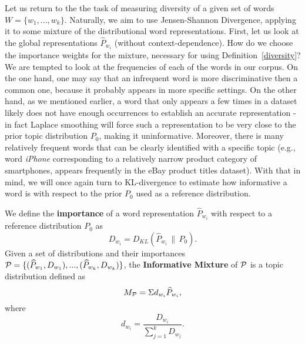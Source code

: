 Let us return to the the task of measuring diversity of a given set of words
$W=\{w_1,...,w_k\}$. Naturally, we aim to use Jensen-Shannon
Divergence, applying it to some mixture of the distributional word
representations. First, let us look at the global representations
$\widehat{P}_{w_i}$ (without context-dependence). How do we choose the
importance weights for the mixture, necessary for using
Definition~\ref{diversity}? 
We 
are tempted to look at the frequencies of each of the words in our
corpus. On the one hand, one may say that an infrequent word is more
discriminative then a common one, because it probably appears in more
specific settings. On the other hand, as we mentioned earlier, a word
that only appears a few 
times in a dataset likely does not have enough occurrences to establish an
accurate representation - in fact Laplace smoothing will force such a
representation to be very close to the prior topic distribution
$P_0$, making it uninformative. Moreover, there is many relatively frequent words
that can be clearly identified with a specific topic (e.g., word
{\em iPhone} corresponding to a relatively narrow product category of smartphones,
appears frequently in the eBay product titles dataset). With
that in mind, we will once again turn to KL-divergence to
estimate how informative a word is with respect to the prior $P_0$
used as a reference distribution.

\bed\label{mixture}
We define the {\bf importance} of a word representation $\widehat{P}_{w_i}$ with
respect to a reference distribution $P_0$ as 
\[D_{w_i}=D_{KL}(\widehat{P}_{w_i}\,\|\,P_0).\]
Given a set of distributions and their importances ${\mathcal P} =
\{(\widehat{P}_{w_1},D_{w_1}),...,(\widehat{P}_{w_k},D_{w_k})\}$, the
{\bf Informative Mixture} of ${\mathcal P}$ is a topic distribution defined as 
\[M_{{\mathcal P}} = \Sigma d_{w_i} \widehat{P}_{w_i},\]
where
\[d_{w_i} = \frac{D_{w_i}}{\sum_{j=1}^k D_{w_j}}.\]
\eed


